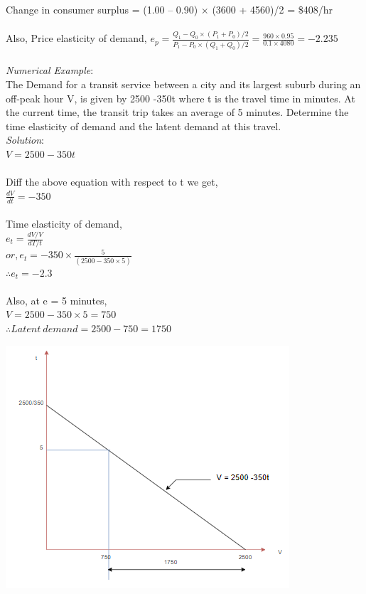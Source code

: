 Change in consumer surplus = (1.00 – 0.90) × (3600 + 4560)/2 = \$408/hr\\\\
Also, Price elasticity of demand,
$ e_p = \frac{Q_1 - Q_0 \times (P_1 + P_0)/2}{P_1 - P_0 \times (Q_1 + Q_0)/2} = \frac{960 \times 0.95}{0.1 \times 4080} = -2.235$\\\\
\textit{Numerical Example}:\\
The Demand for a transit service between a city and its largest suburb during an off-peak hour V, is given by 2500 -350t where t is the travel time in minutes. At the current time, the transit trip takes an average of 5 minutes. Determine the time elasticity of demand and the latent demand at this travel.\\
\textit{Solution}:\\
$V = 2500 - 350t$\\\\
Diff the above equation with respect to t we get,\\
$ \frac{dV}{dt} = -350$\\\\
Time elasticity of demand,\\
$e_t = \frac{dV/V}{dT/t}$\\
$or, e_t = -350 \times \frac{5}{(2500 - 350 \times 5)}$\\
$ \therefore e_t = -2.3$\\\\
Also, at e = 5 minutes,\\
$ V = 2500 - 350 \times 5  = 750$\\
$\therefore Latent \: demand = 2500 -750 = 1750$
\begin{center}
	\includegraphics[scale=0.7]{gfx/fig52.png}
\end{center}
%
